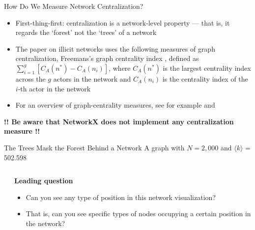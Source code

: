 \documentclass[show notes, aspectratio=1610]{beamer}
\begin{document}
\begin{frame}{How Do We Measure Network Centralization?}{}
	\begin{itemize}
		\item First-thing-first: centralization is a network-level 
		property --- that is, it regards the `forest' not the `trees'
		of a network
		\item The paper on illicit networks uses the following measures 
		of graph centralization, Freemans's graph centrality index \cite{freeman1979}
		, defined as $\sum_{i=1}^{g}[C_{A}(n^{*}) - C_{A}(n_{i})]$,
		where $C_{A}(n^{*})$ is the largest centrality index across 
		the $g$ actors in the network and $C_{A}(n_{i})$ is the
		centrality index of the $i$-th actor in the network
		\item For an overview of graph-centrality measures, see for 
		example \cite{borgatti_everett2006} and \cite[][pages 176-177]{wasserman_faust1994}
	\end{itemize}

	\vspace{2em}

	\textbf{\small !! Be aware that NetworkX does not implement any centralization 
	measure !!}
\end{frame}

\begin{frame}{The Trees Mask the Forest Behind a Network}
	{A graph with $N = 2,000$ and $\langle k \rangle$ = 502.598 }
	\begin{columns}
		\begin{column}{0.5\textwidth}
			\centering 
			

		\end{column}
		\begin{column}{0.3\textwidth}
			\textbf{Leading question}

			\begin{itemize}
				\item 
				Can you see any type of position in this 
				network visualization?
				\item That is, can you see specific types of nodes 
				occupying a certain position in the network?
			\end{itemize}
		\end{column}
	\end{columns}
\end{frame}
\end{document}
